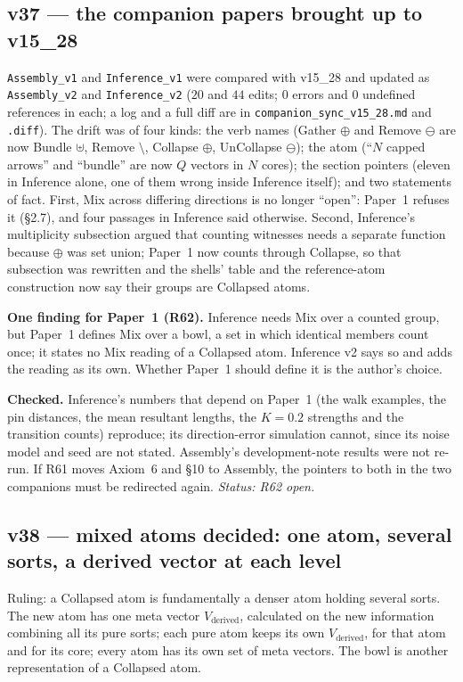 \documentclass[11pt]{article}
\begin{document}
\subsection*{v37 --- the companion papers brought up to v15\_28}
\texttt{Assembly\_v1} and \texttt{Inference\_v1} were compared with v15\_28 and
updated as \texttt{Assembly\_v2} and \texttt{Inference\_v2} ($20$ and $44$
edits; $0$ errors and $0$ undefined references in each; a log and a full diff
are in \texttt{companion\_sync\_v15\_28.md} and \texttt{.diff}). The drift was
of four kinds: the verb names (Gather $\oplus$ and Remove $\ominus$ are now
Bundle $\uplus$, Remove $\setminus$, Collapse $\oplus$, UnCollapse $\ominus$);
the atom (``$N$ capped arrows'' and ``bundle'' are now $Q$ vectors in $N$
cores); the section pointers (eleven in Inference alone, one of them wrong
inside Inference itself); and two statements of fact. First, Mix across
differing directions is no longer ``open'': Paper~1 refuses it (\S2.7), and four
passages in Inference said otherwise. Second, Inference's multiplicity
subsection argued that counting witnesses needs a separate function because
$\oplus$ was set union; Paper~1 now counts through Collapse, so that
subsection was rewritten and the shells' table and the reference-atom
construction now say their groups are Collapsed atoms.

\textbf{One finding for Paper~1 (R62).} Inference needs Mix over a counted
group, but Paper~1 defines Mix over a bowl, a set in which identical members
count once; it states no Mix reading of a Collapsed atom. Inference v2 says so
and adds the reading as its own. Whether Paper~1 should define it is the
author's choice.

\textbf{Checked.} Inference's numbers that depend on Paper~1 (the walk
examples, the pin distances, the mean resultant lengths, the $K=0.2$
strengths and the transition counts) reproduce; its direction-error
simulation cannot, since its noise model and seed are not stated. Assembly's
development-note results were not re-run. If R61 moves Axiom~6 and \S10 to
Assembly, the pointers to both in the two companions must be redirected again.
\emph{Status: R62 open.}


\subsection*{v38 --- mixed atoms decided: one atom, several sorts, a derived vector at each level}
Ruling: a Collapsed atom is fundamentally a denser atom holding several sorts.
The new atom has one meta vector $V_{\text{derived}}$, calculated on the new
information combining all its pure sorts; each pure atom keeps its own
$V_{\text{derived}}$, for that atom and for its core; every atom has its own
set of meta vectors. The bowl is another representation of a Collapsed atom.
\end{document}
